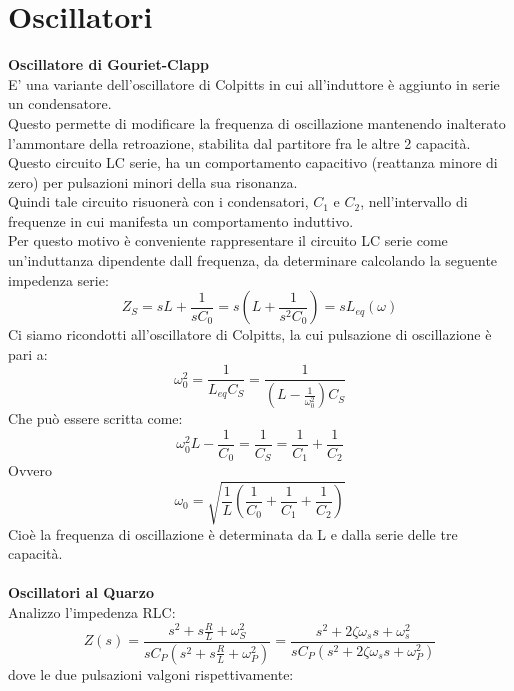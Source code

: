 \documentclass{article}
\begin{document}
\section{Oscillatori}
\textbf{Oscillatore di Gouriet-Clapp}\\
E' una variante dell'oscillatore di Colpitts in cui all'induttore è aggiunto in serie un condensatore.\\
Questo permette di modificare la frequenza di oscillazione mantenendo inalterato l'ammontare della retroazione, stabilita dal partitore fra le altre 2 capacità.\\
Questo circuito LC serie, ha un comportamento capacitivo (reattanza minore di zero) per pulsazioni minori della sua risonanza.\\
Quindi tale circuito risuonerà con i condensatori, $C_{1}$ e $C_{2}$, nell'intervallo di frequenze in cui manifesta un comportamento induttivo.\\
Per questo motivo è conveniente rappresentare il circuito LC serie come un'induttanza dipendente dall frequenza, da determinare calcolando la seguente impedenza serie:
\begin{equation}
    Z_{S}=sL+\frac{1}{sC_{0}}=s(L+\frac{1}{s^2C_{0}})=sL_{eq}(\omega)
\end{equation}
Ci siamo ricondotti all'oscillatore di Colpitts, la cui pulsazione di oscillazione è pari a:
\begin{equation}
    \omega_{0}^2=\frac{1}{L_{eq}C_{S}}=\frac{1}{(L-\frac{1}{\omega_{0}^2})C_{S}}
\end{equation}
Che può essere scritta come:
\begin{equation}
     \omega_{0}^2L-\frac{1}{C_{0}}=\frac{1}{C_{S}}=\frac{1}{C_{1}}+\frac{1}{C_{2}}
\end{equation}
Ovvero
\begin{equation}
    \omega_{0}=\sqrt{\frac{1}{L}(\frac{1}{C_{0}}+\frac{1}{C_{1}}+\frac{1}{C_{2}})}
\end{equation}
Cioè la frequenza di oscillazione è determinata da L e dalla serie delle tre capacità.\\\\
\textbf{Oscillatori al Quarzo}\\
Analizzo l'impedenza RLC:
\begin{equation}
    Z(s)=\frac{s^2+s\frac{R}{L}+\omega_{S}^2}{sC_{P}(s^2+s\frac{R}{L}+\omega_{P}^2)}=\frac{s^2+2\zeta\omega_{s}s+\omega_{s}^2}{sC_{P}(s^2+2\zeta\omega_{s}s+\omega_{P}^2)}
\end{equation}
dove le due pulsazioni valgoni rispettivamente:
\end{document}
